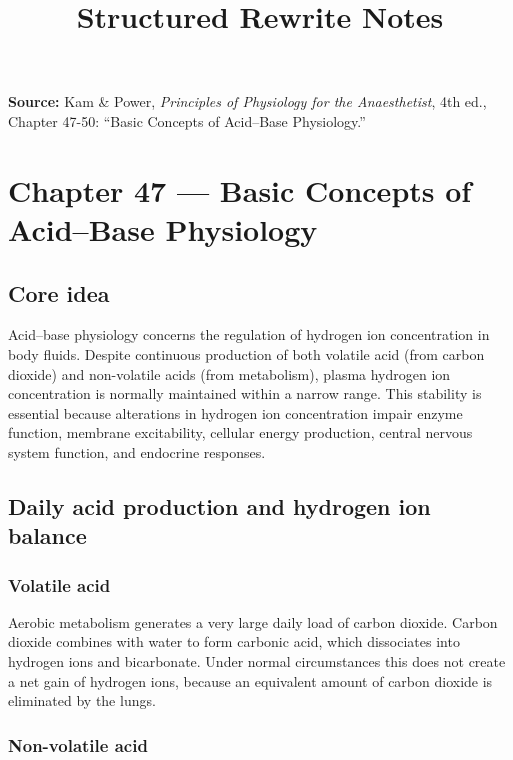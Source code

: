 \documentclass[11pt,a4paper]{article}
\title{Structured Rewrite Notes}
\author{}
\date{}
\begin{document}
\maketitle

\noindent\textbf{Source:} Kam \& Power, \textit{Principles of Physiology for the Anaesthetist}, 4th ed., Chapter 47-50: ``Basic Concepts of Acid--Base Physiology.''

\tableofcontents

\section{Chapter 47 --- Basic Concepts of Acid--Base Physiology}

\subsection{Core idea}

Acid--base physiology concerns the regulation of hydrogen ion concentration in body fluids. Despite continuous production of both volatile acid (from carbon dioxide) and non-volatile acids (from metabolism), plasma hydrogen ion concentration is normally maintained within a narrow range. This stability is essential because alterations in hydrogen ion concentration impair enzyme function, membrane excitability, cellular energy production, central nervous system function, and endocrine responses.

\subsection{Daily acid production and hydrogen ion balance}

\subsubsection{Volatile acid}

Aerobic metabolism generates a very large daily load of carbon dioxide. Carbon dioxide combines with water to form carbonic acid, which dissociates into hydrogen ions and bicarbonate. Under normal circumstances this does not create a net gain of hydrogen ions, because an equivalent amount of carbon dioxide is eliminated by the lungs.

\subsubsection{Non-volatile acid}
\end{document}
